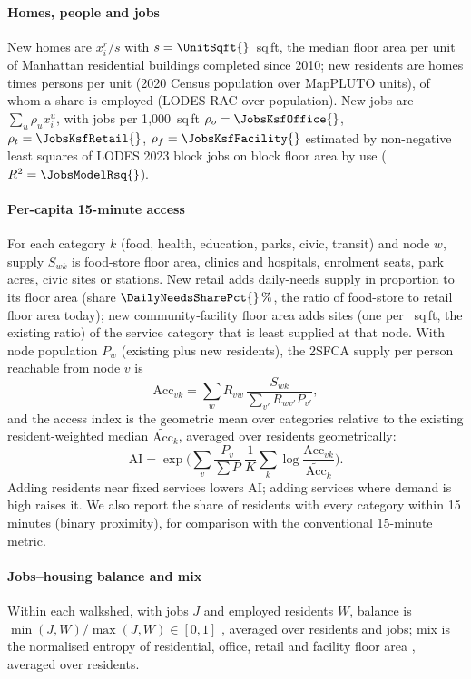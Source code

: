 \documentclass[preprint,12pt]{elsarticle}
\begin{document}
\paragraph{Homes, people and jobs} New homes are $x^r_i/s$ with $s=\UnitSqft{}$~sq\,ft, the median floor area per unit of Manhattan residential buildings completed since 2010; new residents are homes times \PersonsPerUnit{} persons per unit (2020 Census population over MapPLUTO units), of whom a share \EmployedPerResident{} is employed (LODES RAC over population). New jobs are $\sum_u \rho_u x^u_i$, with jobs per 1{,}000~sq\,ft $\rho_o=\JobsKsfOffice{}$, $\rho_t=\JobsKsfRetail{}$, $\rho_f=\JobsKsfFacility{}$ estimated by non-negative least squares of LODES 2023 block jobs on block floor area by use ($R^2=\JobsModelRsq{}$).

\paragraph{Per-capita 15-minute access} For each category $k$ (food, health, education, parks, civic, transit) and node $w$, supply $S_{wk}$ is food-store floor area, clinics and hospitals, enrolment seats, park acres, civic sites or stations. New retail adds daily-needs supply in proportion to its floor area (share $\DailyNeedsSharePct{}\,\%$, the ratio of food-store to retail floor area today); new community-facility floor area adds sites (one per \FacilitySqftPerSite{}~sq\,ft, the existing ratio) of the service category that is least supplied at that node. With node population $P_w$ (existing plus new residents), the 2SFCA \cite{luo2003measures} supply per person reachable from node $v$ is
\begin{equation}
\mathrm{Acc}_{vk} = \sum_w R_{vw}\, \frac{S_{wk}}{\sum_{v'} R_{wv'} P_{v'}},
\end{equation}
and the access index is the geometric mean over categories relative to the existing resident-weighted median $\tilde{\mathrm{Acc}}_k$, averaged over residents geometrically:
\begin{equation}
\mathrm{AI}=\exp\Big(\sum_v \frac{P_v}{\sum P}\ \frac1K\sum_k \log\frac{\mathrm{Acc}_{vk}}{\tilde{\mathrm{Acc}}_k}\Big).
\end{equation}
Adding residents near fixed services lowers AI; adding services where demand is high raises it. We also report the share of residents with every category within 15 minutes (binary proximity), for comparison with the conventional 15-minute metric.

\paragraph{Jobs--housing balance and mix} Within each walkshed, with jobs $J$ and employed residents $W$, balance is $\min(J,W)/\max(J,W)\in[0,1]$ \cite{cervero1989jobs}, averaged over residents and jobs; mix is the normalised entropy of residential, office, retail and facility floor area \cite{song2013comparing}, averaged over residents.
\end{document}
